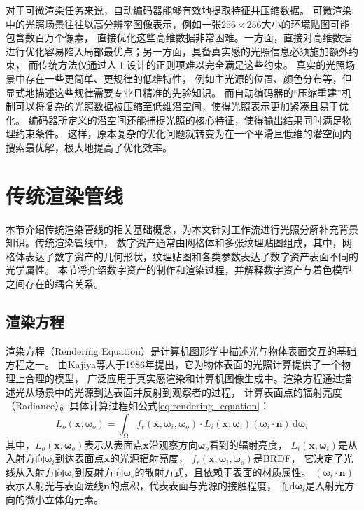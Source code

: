 对于可微渲染任务来说，自动编码器能够有效地提取特征并压缩数据。
可微渲染中的光照场景往往以高分辨率图像表示，例如一张$256\times256$大小的环境贴图可能包含数百万个像素，
直接优化这些高维数据非常困难。一方面，直接对高维数据进行优化容易陷入局部最优点；另一方面，具备真实感的光照信息必须施加额外约束，
而传统方法仅通过人工设计的正则项难以完全满足这些约束。
真实的光照场景中存在一些更简单、更规律的低维特性，
例如主光源的位置、颜色分布等，但显式地描述这些规律需要专业且精准的先验知识。
而自动编码器的“压缩重建”机制可以将复杂的光照数据被压缩至低维潜空间，使得光照表示更加紧凑且易于优化。
编码器所定义的潜空间还能捕捉光照的核心特征，使得输出结果同时满足物理约束条件。
这样，原本复杂的优化问题就转变为在一个平滑且低维的潜空间内搜索最优解，极大地提高了优化效率。

\section{传统渲染管线}
本节介绍传统渲染管线的相关基础概念，为本文针对工作流进行光照分解补充背景知识。传统渲染管线中，
数字资产通常由网格体和多张纹理贴图组成，其中，网格体表达了数字资产的几何形状，纹理贴图和各类参数表达了数字资产表面不同的光学属性。
本节将介绍数字资产的制作和渲染过程，并解释数字资产与着色模型之间存在的耦合关系。

\subsection{渲染方程}
渲染方程（Rendering Equation）是计算机图形学中描述光与物体表面交互的基础方程之一。
由Kajiya等人于1986年提出\cite{Kajiya_1986}，它为物体表面的光照计算提供了一个物理上合理的模型，
广泛应用于真实感渲染和计算机图像生成中。渲染方程通过描述光从场景中的光源到达表面并反射到观察者的过程，
计算表面点的辐射亮度（Radiance）。具体计算过程如公式\eqref{eq:rendering_equation}：
\begin{equation}
  \label{eq:rendering_equation}
  L_o\left({\boldsymbol{x}},{\boldsymbol{\omega}}_o\right)=\int_{\upOmega}f_r\left({\boldsymbol{x}},{\boldsymbol{\omega}}_i,{\boldsymbol{\omega}}_o\right)\cdot L_i\left({\boldsymbol{x}},
  {\boldsymbol{\omega}}_i\right)\left({\boldsymbol{\omega}}_i\cdot\boldsymbol{n}\right)\,\mathrm{d}{\boldsymbol{\omega}}_i
\end{equation}
其中，$L_o\left({\boldsymbol{x}},{\boldsymbol{\omega}}_o\right)$表示从表面点$\boldsymbol{x}$沿观察方向${\boldsymbol{\omega}}_o$看到的辐射亮度，
$L_i\left({\boldsymbol{x}},{\boldsymbol{\omega}}_i\right)$是从入射方向${\boldsymbol{\omega}}_i$到达表面点$\boldsymbol{x}$的光源辐射亮度，
$f_r\left({\boldsymbol{x}},{\boldsymbol{\omega}}_i,{\boldsymbol{\omega}}_o\right)$是BRDF，
它决定了光线从入射方向${\boldsymbol{\omega}}_i$到反射方向${\boldsymbol{\omega}}_o$的散射方式，且依赖于表面的材质属性。
$\left({\boldsymbol{\omega}}_i\cdot\boldsymbol{n}\right)$表示入射光与表面法线$\boldsymbol{n}$的点积，代表表面与光源的接触程度，
而$\mathrm{d}{\boldsymbol{\omega}}_i$是入射光方向的微小立体角元素。

